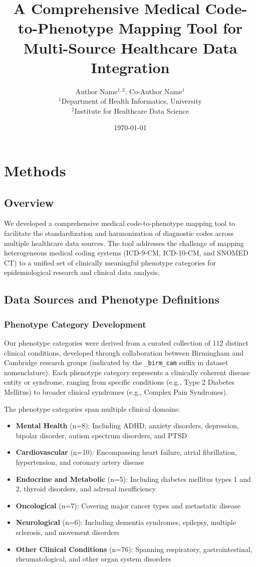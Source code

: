 \documentclass[11pt]{article}
\title{A Comprehensive Medical Code-to-Phenotype Mapping Tool for Multi-Source Healthcare Data Integration}
\author{Author Name$^{1,2}$, Co-Author Name$^{1}$\\
$^1$Department of Health Informatics, University\\
$^2$Institute for Healthcare Data Science}
\date{\today}
\begin{document}
\maketitle

\section{Methods}

\subsection{Overview}

We developed a comprehensive medical code-to-phenotype mapping tool to facilitate the standardization and harmonization of diagnostic codes across multiple healthcare data sources. The tool addresses the challenge of mapping heterogeneous medical coding systems (ICD-9-CM, ICD-10-CM, and SNOMED CT) to a unified set of clinically meaningful phenotype categories for epidemiological research and clinical data analysis.

\subsection{Data Sources and Phenotype Definitions}

\subsubsection{Phenotype Category Development}

Our phenotype categories were derived from a curated collection of 112 distinct clinical conditions, developed through collaboration between Birmingham and Cambridge research groups (indicated by the \texttt{\_birm\_cam} suffix in dataset nomenclature). Each phenotype category represents a clinically coherent disease entity or syndrome, ranging from specific conditions (e.g., Type 2 Diabetes Mellitus) to broader clinical syndromes (e.g., Complex Pain Syndromes).

The phenotype categories span multiple clinical domains:
\begin{itemize}
    \item \textbf{Mental Health} (n=8): Including ADHD, anxiety disorders, depression, bipolar disorder, autism spectrum disorders, and PTSD
    \item \textbf{Cardiovascular} (n=10): Encompassing heart failure, atrial fibrillation, hypertension, and coronary artery disease
    \item \textbf{Endocrine and Metabolic} (n=5): Including diabetes mellitus types 1 and 2, thyroid disorders, and adrenal insufficiency
    \item \textbf{Oncological} (n=7): Covering major cancer types and metastatic disease
    \item \textbf{Neurological} (n=6): Including dementia syndromes, epilepsy, multiple sclerosis, and movement disorders
    \item \textbf{Other Clinical Conditions} (n=76): Spanning respiratory, gastrointestinal, rheumatological, and other organ system disorders
\end{itemize}
\end{document}
